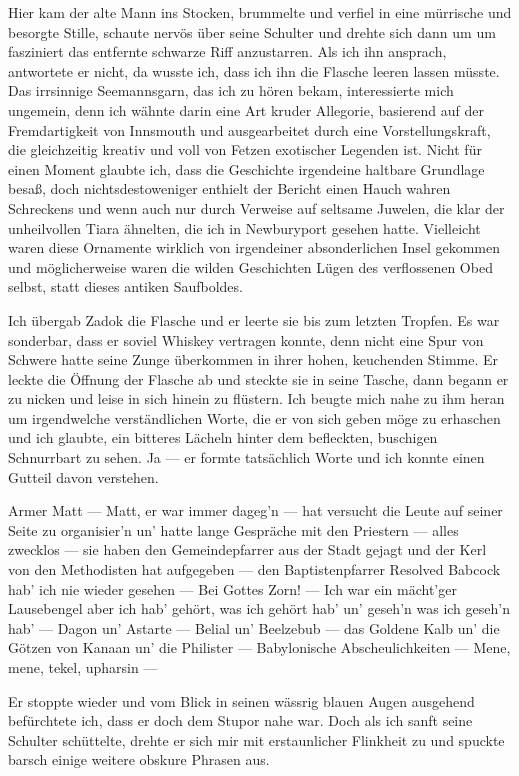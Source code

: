 Hier kam der alte Mann ins Stocken, brummelte und verfiel in eine mürrische und besorgte Stille, schaute nervös über seine Schulter und drehte sich dann um um fasziniert das entfernte schwarze Riff anzustarren. Als ich ihn ansprach, antwortete er nicht, da wusste ich, dass ich ihn die Flasche leeren lassen müsste. Das irrsinnige Seemannsgarn, das ich zu hören bekam, interessierte mich ungemein, denn ich wähnte darin eine Art kruder Allegorie, basierend auf der Fremdartigkeit von Innsmouth und ausgearbeitet durch eine Vorstellungskraft, die gleichzeitig kreativ und voll von Fetzen exotischer Legenden ist. Nicht für einen Moment glaubte ich, dass die Geschichte irgendeine haltbare Grundlage besaß, doch nichtsdestoweniger enthielt der Bericht einen Hauch wahren Schreckens und wenn auch nur durch Verweise auf seltsame Juwelen, die klar der unheilvollen Tiara ähnelten, die ich in Newburyport gesehen hatte. Vielleicht waren diese Ornamente wirklich von irgendeiner absonderlichen Insel gekommen und möglicherweise waren die wilden Geschichten Lügen des verflossenen Obed selbst, statt dieses antiken Saufboldes.

Ich übergab Zadok die Flasche und er leerte sie bis zum letzten Tropfen. Es war sonderbar, dass er soviel Whiskey vertragen konnte, denn nicht eine Spur von Schwere hatte seine Zunge überkommen in ihrer hohen, keuchenden Stimme. Er leckte die Öffnung der Flasche ab und steckte sie in seine Tasche, dann begann er zu nicken und leise in sich hinein zu flüstern. Ich beugte mich nahe zu ihm heran um irgendwelche verständlichen Worte, die er von sich geben möge zu erhaschen und ich glaubte, ein bitteres Lächeln hinter dem befleckten, buschigen Schnurrbart zu sehen. Ja --- er formte tatsächlich Worte und ich konnte einen Gutteil davon verstehen.

\glqq Armer Matt --- Matt, er war immer dageg'n --- hat versucht die Leute auf seiner Seite zu organisier'n un' hatte lange Gespräche mit den Priestern --- alles zwecklos --- sie haben den Gemeindepfarrer aus der Stadt gejagt und der Kerl von den Methodisten hat aufgegeben --- den Baptistenpfarrer Resolved Babcock hab' ich nie wieder gesehen --- Bei Gottes Zorn! --- Ich war ein mächt'ger Lausebengel aber ich hab' gehört, was ich gehört hab' un' geseh'n was ich geseh'n hab' --- Dagon un' Astarte --- Belial un' Beelzebub --- das Goldene Kalb un' die Götzen von Kanaan un' die Philister --- Babylonische Abscheulichkeiten --- Mene, mene, tekel, upharsin ---\grqq

Er stoppte wieder und vom Blick in seinen wässrig blauen Augen ausgehend befürchtete ich, dass er doch dem Stupor nahe war. Doch als ich sanft seine Schulter schüttelte, drehte er sich mir mit erstaunlicher Flinkheit zu und spuckte barsch einige weitere obskure Phrasen aus.

